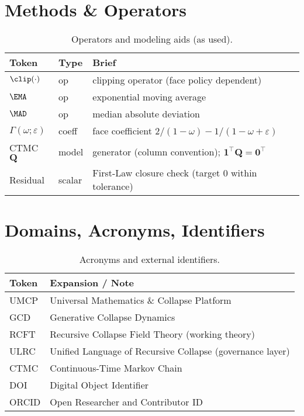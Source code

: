 \section{Methods \& Operators}
\label{sec:glossary-methods}
\begin{table}[H]
  \centering
  \caption{Operators and modeling aids (as used).}
  \label{tab:glossary-methods}
  \footnotesize
  \begingroup\setlength{\tabcolsep}{6pt}
  \begin{tabularx}{\linewidth}{@{} l l >{\raggedright\arraybackslash}X @{}}
    \toprule
    Token & Type & Brief \\
    \midrule
    $\clip(\cdot)$ & op & clipping operator (face policy dependent) \\
    $\EMA$         & op & exponential moving average \\
    $\MAD$         & op & median absolute deviation \\
    $\Gamma(\omega;\varepsilon)$ & coeff & face coefficient $2/(1-\omega)-1/(1-\omega+\varepsilon)$ \\
    CTMC $\mathbf{Q}$ & model & generator (column convention); $\mathbf{1}^\top \mathbf{Q}=\mathbf{0}^\top$ \\
    Residual & scalar & First-Law closure check (target $0$ within tolerance) \\
    \bottomrule
  \end{tabularx}
  \endgroup
\end{table}

\section{Domains, Acronyms, Identifiers}
\label{sec:glossary-acro}
\begin{table}[H]
  \centering
  \caption{Acronyms and external identifiers.}
  \label{tab:glossary-acro}
  \footnotesize
  \begingroup\setlength{\tabcolsep}{6pt}
  \begin{tabularx}{\linewidth}{@{} l >{\raggedright\arraybackslash}X @{}}
    \toprule
    Token & Expansion / Note \\
    \midrule
    UMCP & Universal Mathematics \& Collapse Platform \\
    GCD  & Generative Collapse Dynamics \\
    RCFT & Recursive Collapse Field Theory (working theory) \\
    ULRC & Unified Language of Recursive Collapse (governance layer) \\
    CTMC & Continuous-Time Markov Chain \\
    DOI  & Digital Object Identifier \\
    ORCID & Open Researcher and Contributor ID \\
    \bottomrule
  \end{tabularx}
  \endgroup
\end{table}
